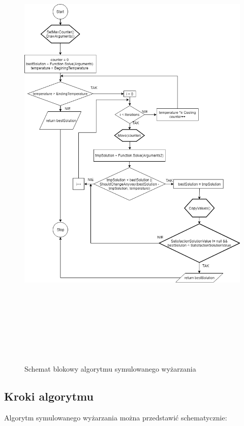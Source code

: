\documentclass[twoside]{projektInzynierskiMS1}
\begin{document}
\begin{figure}[H]
		\includegraphics[height=22cm, width=16cm]{pics/blockDiagram.png}\\
	\caption{Schemat blokowy algorytmu symulowanego wyżarzania}
\end{figure}


		\subsection{Kroki algorytmu}
		
		Algorytm symulowanego wyżarzania można przedstawić schematycznie:
\end{document}
